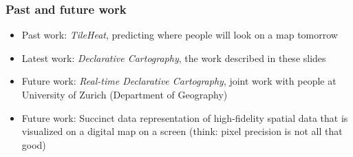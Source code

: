 \documentclass{beamer}
\begin{document}
\frame
{
  \frametitle{Past and future work}

  \begin{itemize}
  \item Past work: \emph{TileHeat}, predicting where people will look on a map tomorrow
  \item Latest work: \emph{Declarative Cartography}, the work described in these slides
  \item Future work: \emph{Real-time Declarative Cartography}, joint work with people at University of Zurich (Department of Geography)
  \item Future work: Succinct data representation of high-fidelity spatial data that is visualized on a digital map on a screen (think: pixel precision is not all that good)
  \end{itemize}
}
\end{document}
